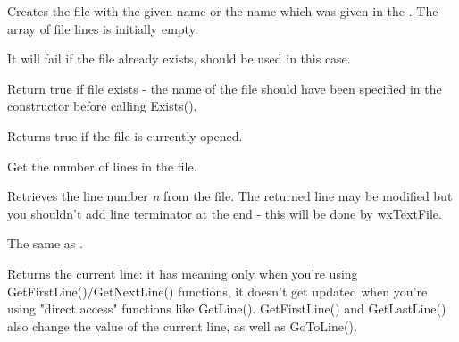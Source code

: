 \label{wxtextfilecreate}



Creates the file with the given name or the name which was given in the
. The array of file lines is initially
empty.

It will fail if the file already exists,  should
be used in this case.

\label{wxtextfileexists}


Return true if file exists - the name of the file should have been specified
in the constructor before calling Exists().

\label{wxtextfileisopened}


Returns true if the file is currently opened.

\label{wxtextfilegetlinecount}


Get the number of lines in the file.

\label{wxtextfilegetline}


Retrieves the line number {\it n} from the file. The returned line may be
modified but you shouldn't add line terminator at the end - this will be done
by wxTextFile.

\label{wxtextfileoperatorarray}


The same as .

\label{wxtextfilegetcurrentline}


Returns the current line: it has meaning only when you're using
GetFirstLine()/GetNextLine() functions, it doesn't get updated when
you're using "direct access" functions like GetLine(). GetFirstLine() and
GetLastLine() also change the value of the current line, as well as
GoToLine().


